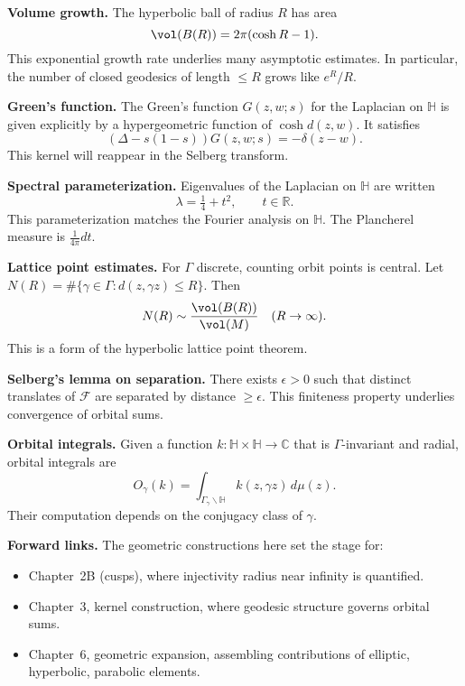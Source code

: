 \medskip

\noindent\textbf{Volume growth.}
The hyperbolic ball of radius $R$ has area
\[
  \vol(B(R)) = 2\pi(\cosh R - 1).
\]
This exponential growth rate underlies many asymptotic estimates.
In particular,
the number of closed geodesics of length $\le R$ grows like $e^{R}/R$.

\medskip

\noindent\textbf{Green’s function.}
The Green’s function $G(z,w;s)$ for the Laplacian on $\mathbb{H}$
is given explicitly by a hypergeometric function of $\cosh d(z,w)$.
It satisfies
\[
  (\Delta - s(1-s)) G(z,w;s) = -\delta(z-w).
\]
This kernel will reappear in the Selberg transform.

\medskip

\noindent\textbf{Spectral parameterization.}
Eigenvalues of the Laplacian on $\mathbb{H}$ are written
\[
  \lambda = \tfrac14 + t^{2}, \qquad t\in\mathbb{R}.
\]
This parameterization matches the Fourier analysis on $\mathbb{H}$.
The Plancherel measure is $\tfrac{1}{4\pi}dt$.

\medskip

\noindent\textbf{Lattice point estimates.}
For $\Gamma$ discrete, counting orbit points is central.
Let $N(R)=\#\{\gamma\in\Gamma : d(z,\gamma z)\le R\}$.
Then
\[
  N(R) \sim \frac{\vol(B(R))}{\vol(M)} \quad (R\to\infty).
\]
This is a form of the hyperbolic lattice point theorem.

\medskip

\noindent\textbf{Selberg’s lemma on separation.}
There exists $\epsilon>0$ such that distinct translates of $\mathcal{F}$
are separated by distance $\ge \epsilon$.
This finiteness property underlies convergence of orbital sums.

\medskip

\noindent\textbf{Orbital integrals.}
Given a function $k:\mathbb{H}\times\mathbb{H}\to\mathbb{C}$
that is $\Gamma$-invariant and radial, orbital integrals are
\[
  O_{\gamma}(k) = \int_{\Gamma_{\gamma}\backslash\mathbb{H}} k(z,\gamma z)\,d\mu(z).
\]
Their computation depends on the conjugacy class of $\gamma$.

\medskip

\noindent\textbf{Forward links.}
The geometric constructions here set the stage for:
\begin{itemize}
  \item Chapter~2B (cusps), where injectivity radius near infinity is quantified.
  \item Chapter~3, kernel construction, where geodesic structure governs orbital sums.
  \item Chapter~6, geometric expansion, assembling contributions of elliptic, hyperbolic, parabolic elements.
\end{itemize}

